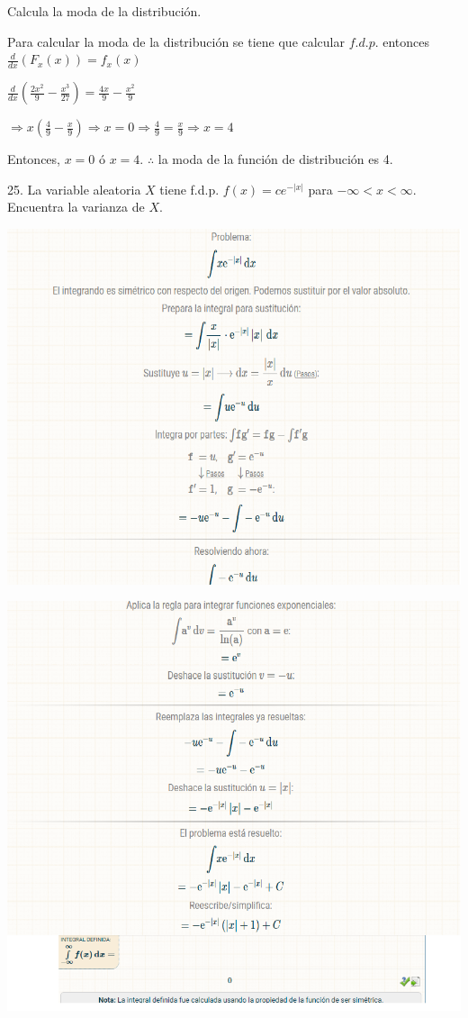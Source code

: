 \documentclass{article}
\begin{document}
        Calcula la moda de la distribución.\vspace{.1cm}

        \vspace{.1cm}

        Para calcular la moda de la distribución se tiene que calcular $f.d.p.$ entonces $\frac{d}{dx}(F_x(x))=f_x(x)$\vspace{.1cm}

        $\frac{d}{dx}(\frac{2x^2}{9}-\frac{x^3}{27})=\frac{4x}{9}-\frac{x^2}{9}$\vspace{.1cm}

        $\Rightarrow x(\frac{4}{9}-\frac{x}{9}) \Rightarrow x = 0 \Rightarrow \frac{4}{9}= \frac{x}{9} \Rightarrow x = 4$\vspace{.2cm}

        Entonces, $x=0$ ó $x=4$. $\therefore$ la moda de la función de distribución es 4.\vspace{.3cm}

        25. La variable aleatoria $X$ tiene f.d.p. $f(x)=ce^{-|x|}$ para $-\infty<x<\infty$. 
        Encuentra la varianza de $X$.

        \begin{center}
            \includegraphics[scale=0.4]{proba2.png}   
        \end{center}

        \begin{center}
            \includegraphics[scale=0.4]{proba3.png}
        \end{center}
    
\end{document}
